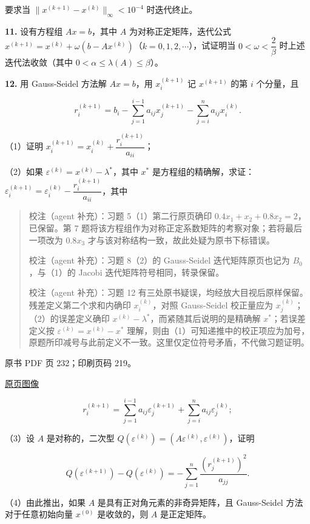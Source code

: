 要求当 \(\|x^{(k+1)}-x^{(k)}\|_\infty<10^{-4}\) 时迭代终止。

\textbf{11.} 设有方程组 \(Ax=b\)，其中 \(A\) 为对称正定矩阵，迭代公式 \(x^{(k+1)}=x^{(k)}+\omega(b-Ax^{(k)})\)（\(k=0,1,2,\cdots\)），试证明当 \(0<\omega<\dfrac2\beta\) 时上述迭代法收敛（其中 \(0<\alpha\leqslant\lambda(A)\leqslant\beta\)）。

\textbf{12.} 用 Gauss-Seidel 方法解 \(Ax=b\)，用 \(x_i^{(k+1)}\) 记 \(x^{(k+1)}\) 的第 \(i\) 个分量，且

\[
r_i^{(k+1)}=b_i-\sum_{j=1}^{i-1}a_{ij}x_j^{(k+1)}-\sum_{j=i}^n a_{ij}x_i^{(k)}.
\]

（1）证明 \(x_i^{(k+1)}=x_i^{(k)}+\dfrac{r_i^{(k+1)}}{a_{ii}}\)；

（2）如果 \(\varepsilon^{(k)}=x^{(k)}-\lambda^*\)，其中 \(x^*\) 是方程组的精确解，求证：\(\varepsilon_i^{(k+1)}=\varepsilon_i^{(k)}-\dfrac{r_i^{(k+1)}}{a_{ii}}\)，其中

\begin{quote}
校注（agent 补充）：习题 5（1）第二行原页确印 \(0.4x_1+x_2+0.8x_2=2\)，已保留。第 7 题将该方程组作为对称正定系数矩阵的考察对象；若将最后一项改为 \(0.8x_3\) 才与该对称结构一致，故此处疑为原书下标错误。

校注（agent 补充）：习题 8（2）的 Gauss-Seidel 迭代矩阵原页也记为 \(B_0\)，与（1）的 Jacobi 迭代矩阵符号相同，转录保留。

校注（agent 补充）：习题 12 有三处原书疑误，均经放大目视后原样保留。残差定义第二个求和内确印 \(x_i^{(k)}\)，对照 Gauss-Seidel 校正量应为 \(x_j^{(k)}\)；（2）的误差定义确印 \(x^{(k)}-\lambda^*\)，而紧随其后说明的是精确解 \(x^*\)；若误差定义按 \(\varepsilon^{(k)}=x^{(k)}-x^*\) 理解，则由（1）可知递推中的校正项应为加号，原题所印减号与此前定义不一致。这里仅定位符号矛盾，不代做习题证明。
\end{quote}

\clearpage

原书 PDF 页 232；印刷页码 219。

\href{source-images/pdf-232.jpeg}{原页图像}

\[
r_i^{(k+1)}=\sum_{j=1}^{i-1}a_{ij}\varepsilon_j^{(k+1)}+\sum_{j=i}^n a_{ij}\varepsilon_j^{(k)};
\]

（3）设 \(A\) 是对称的，二次型 \(Q(\varepsilon^{(k)})=(A\varepsilon^{(k)},\varepsilon^{(k)})\)，证明

\[
Q(\varepsilon^{(k+1)})-Q(\varepsilon^{(k)})=-\sum_{j=1}^n\frac{(r_j^{(k+1)})^2}{a_{jj}}.
\]

（4）由此推出，如果 \(A\) 是具有正对角元素的非奇异矩阵，且 Gauss-Seidel 方法对于任意初始向量 \(x^{(0)}\) 是收敛的，则 \(A\) 是正定矩阵。

